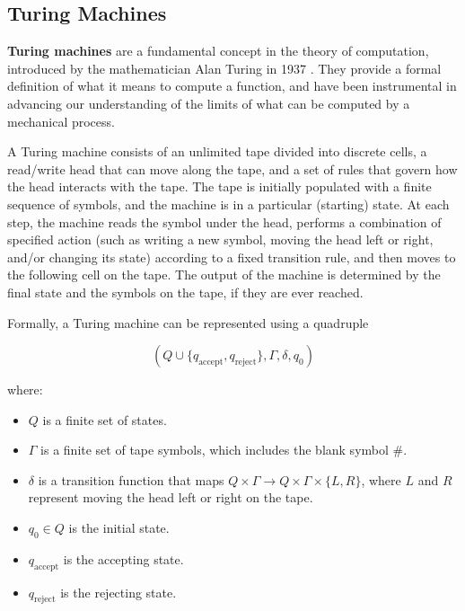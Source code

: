 \documentclass{article}
\begin{document}
\subsection{Turing Machines}

\textbf{Turing machines} are a fundamental concept in the theory of computation, introduced by the mathematician Alan Turing in 1937 \cite{TUR37}. They provide a formal definition of what it means to compute a function, and have been instrumental in advancing our understanding of the limits of what can be computed by a mechanical process.

A Turing machine consists of an unlimited tape divided into discrete cells, a read/write head that can move along the tape, and a set of rules that govern how the head interacts with the tape. The tape is initially populated with a finite sequence of symbols, and the machine is in a particular (starting) state. At each step, the machine reads the symbol under the head, performs a combination of  specified action (such as writing a new symbol, moving the head left or right, and/or changing its state) according to a fixed transition rule, and then moves to the following cell on the tape. The output of the machine is determined by the final state and the symbols on the tape, if they are ever reached.

Formally, a Turing machine can be represented using a quadruple

\begin{equation}
(Q \cup \{q_{\mathrm{accept}}, q_{\mathrm{reject}} \}, \Gamma, \delta, q_0)
\end{equation}

where:

\begin{itemize}
    \item $Q$ is a finite set of states.
    \item $\Gamma$ is a finite set of tape symbols, which includes the blank symbol $\#$.
    \item $\delta$ is a transition function that maps $Q \times \Gamma \rightarrow Q \times \Gamma \times \{L, R\}$, where $L$ and $R$ represent moving the head left or right on the tape.
    \item $q_0 \in Q$ is the initial state.
    \item $q_{\mathrm{accept}}$ is the accepting state.
    \item $q_{\mathrm{reject}}$ is the rejecting state.
\end{itemize}
\end{document}
